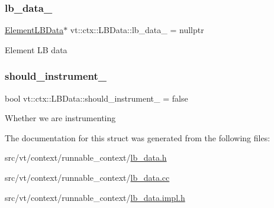 \subsubsection{\texorpdfstring{lb\+\_\+data\+\_\+}{lb\_data\_}}
{\footnotesize\ttfamily \hyperlink{structvt_1_1ctx_1_1_l_b_data_a11f1aeb75c01ae0c77d96f94ce1994bb}{Element\+L\+B\+Data}$\ast$ vt\+::ctx\+::\+L\+B\+Data\+::lb\+\_\+data\+\_\+ = nullptr\hspace{0.3cm}{\ttfamily [private]}}

Element LB data \mbox{\label{structvt_1_1ctx_1_1_l_b_data_a0f36387b1ed5d20e39b72e97251e0efc}} 
\subsubsection{\texorpdfstring{should\+\_\+instrument\+\_\+}{should\_instrument\_}}
{\footnotesize\ttfamily bool vt\+::ctx\+::\+L\+B\+Data\+::should\+\_\+instrument\+\_\+ = false\hspace{0.3cm}{\ttfamily [private]}}

Whether we are instrumenting 

The documentation for this struct was generated from the following files\+:\begin{DoxyCompactItemize}
\item 
src/vt/context/runnable\+\_\+context/\hyperlink{lb__data_8h}{lb\+\_\+data.\+h}\item 
src/vt/context/runnable\+\_\+context/\hyperlink{lb__data_8cc}{lb\+\_\+data.\+cc}\item 
src/vt/context/runnable\+\_\+context/\hyperlink{lb__data_8impl_8h}{lb\+\_\+data.\+impl.\+h}\end{DoxyCompactItemize}
